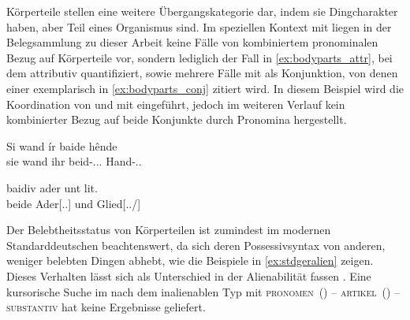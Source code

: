 Körperteile stellen eine weitere Übergangskategorie dar, indem sie
Dingcharakter haben, aber Teil eines Organismus sind. Im speziellen Kontext mit
  liegen in der Belegsammlung zu dieser Arbeit keine
Fälle von kombiniertem pronominalen Bezug auf Körperteile vor, sondern
lediglich der Fall in \cref{ex:bodyparts_attr}, bei dem 
 attributiv   quantifiziert, sowie mehrere
Fälle mit  als Konjunktion, von denen einer exemplarisch in
\cref{ex:bodyparts_conj} zitiert wird. In diesem Beispiel wird die Koordination
von   und   mit 
 eingeführt, jedoch im weiteren Verlauf kein kombinierter Bezug auf
beide Konjunkte durch Pronomina hergestellt.

\begin{exe}
\ex \begin{xlist}
	\ex \label{ex:bodyparts_attr}
		\begin{taggedline}{\parencites%
			[\pno~6\rb, 19]{kc:K}%
			[vgl. abweichend][4\va, 26--27]{kc:A1}%
			[5\va, 4]{kc:H}%
			[7\vb, 8]{kc:M}%
			[4\vb, 49]{kc:B1}%
			[9\ra, 5]{kc:P}%
			[913]{schroeder1895}} %
		\gll Si wand ír baide hênde \\
			sie wand ihr beid-\Acc.\Pl.\F.\St{} Hand-\Acc.\Pl.\F{} \\
		\trans {}
		\end{taggedline}

	\ex \label{ex:bodyparts_conj}
		\begin{taggedline}{\parencites%
			[\pno~32\rb, 31]{kc:A1}%
			[vgl.][44\va, 15]{kc:H}%
			[56\vb, 21]{kc:M}%
			[39\rb, 3]{kc:C1}%
			[45\ra, 32]{kc:K}%
			[147\va, 20]{kc:Z}%
			[7468]{schroeder1895}} %
		\gll baidiv ader unt lit. \\
			beide Ader[\Acc.\Sg.\F] und Glied[\Acc.\Sg.\M/\N] \\
		\trans {}
		\end{taggedline}
\end{xlist}
\end{exe}

Der Belebtheitsstatus von Körperteilen ist zumindest im modernen
Standarddeutschen beachtenswert, da sich deren Possessivsyntax von anderen,
weniger belebten Dingen abhebt, wie die Beispiele in \cref{ex:stdgeralien}
zeigen. Dieses Verhalten lässt sich als Unterschied in der Alienabilität fassen
\autocites{nichols1988}[17--18]{heine1997}.
Eine kursorische Suche im  nach dem inalienablen Typ mit
\textsc{pronomen}~(\Dat) -- \textsc{artikel}~(\Acc) -- \textsc{substantiv} hat
keine Ergebnisse geliefert.

